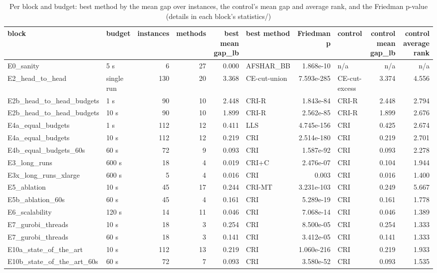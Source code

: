 \begin{table}[htbp]
\centering
\small
\caption{Per block and budget: best method by the mean gap over instances, the control's mean gap and average rank, and the Friedman p-value (details in each block's statistics/)}
\label{tab:headline_results}
\begin{tabular}{llrrrlrlrr}
\toprule
block & budget & instances & methods & best mean gap\_lb & best method & Friedman p & control & control mean gap\_lb & control average rank \\
\midrule
E0\_sanity & 5 s & 6 & 27 & 0.000 & AFSHAR\_BB & 1.868e-10 & n/a & n/a & n/a \\
E2\_head\_to\_head & single run & 130 & 20 & 3.368 & CE-cut-union & 7.593e-285 & CE-cut-excess & 3.374 & 4.556 \\
E2b\_head\_to\_head\_budgets & 1 s & 90 & 10 & 2.448 & CRI-R & 1.843e-84 & CRI-R & 2.448 & 2.794 \\
E2b\_head\_to\_head\_budgets & 10 s & 90 & 10 & 1.899 & CRI-R & 2.562e-85 & CRI-R & 1.899 & 2.676 \\
E4a\_equal\_budgets & 1 s & 112 & 12 & 0.411 & LLS & 4.745e-156 & CRI & 0.425 & 2.674 \\
E4a\_equal\_budgets & 10 s & 112 & 12 & 0.219 & CRI & 2.514e-180 & CRI & 0.219 & 2.701 \\
E4b\_equal\_budgets\_60s & 60 s & 72 & 9 & 0.093 & CRI & 1.587e-92 & CRI & 0.093 & 2.278 \\
E3\_long\_runs & 600 s & 18 & 4 & 0.019 & CRI+C & 2.476e-07 & CRI & 0.104 & 1.944 \\
E3x\_long\_runs\_xlarge & 600 s & 5 & 4 & 0.016 & CRI & 0.003 & CRI & 0.016 & 1.400 \\
E5\_ablation & 10 s & 45 & 17 & 0.244 & CRI-MT & 3.231e-103 & CRI & 0.249 & 5.667 \\
E5b\_ablation\_60s & 60 s & 45 & 4 & 0.161 & CRI & 5.289e-19 & CRI & 0.161 & 1.778 \\
E6\_scalability & 120 s & 14 & 11 & 0.046 & CRI & 7.068e-14 & CRI & 0.046 & 1.389 \\
E7\_gurobi\_threads & 10 s & 18 & 3 & 0.254 & CRI & 8.500e-05 & CRI & 0.254 & 1.333 \\
E7\_gurobi\_threads & 60 s & 18 & 3 & 0.141 & CRI & 3.412e-05 & CRI & 0.141 & 1.333 \\
E10a\_state\_of\_the\_art & 10 s & 112 & 13 & 0.219 & CRI & 1.060e-216 & CRI & 0.219 & 1.933 \\
E10b\_state\_of\_the\_art\_60s & 60 s & 72 & 7 & 0.093 & CRI & 3.580e-52 & CRI & 0.093 & 1.535 \\
\bottomrule
\end{tabular}
\end{table}
